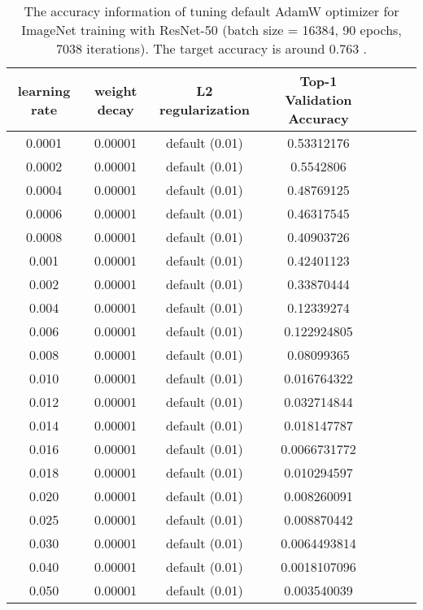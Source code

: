\documentclass{article} \usepackage{iclr2020_conference,times}
\begin{document}
\begin{table}[ht]
\renewcommand{\arraystretch}{1.3}
\caption{The accuracy information of tuning default AdamW optimizer for ImageNet training with ResNet-50 (batch size = 16384, 90 epochs, 7038 iterations). The target accuracy is around 0.763 \citep{goyal2017accurate}.}
\centering
\begin{tabular}{|c|c|c|c|c|c|c|}
\hline
learning rate & weight decay & L2 regularization & Top-1 Validation Accuracy\\
\hline
\hline
0.0001 & 0.00001 & default (0.01) & 0.53312176 \\
\hline
0.0002 & 0.00001 & default (0.01) & 0.5542806 \\
\hline
0.0004 & 0.00001 & default (0.01) & 0.48769125 \\
\hline
0.0006 & 0.00001 & default (0.01) & 0.46317545 \\
\hline
0.0008 & 0.00001 & default (0.01) & 0.40903726 \\
\hline
0.001 & 0.00001 & default (0.01) & 0.42401123 \\
\hline
0.002 & 0.00001 & default (0.01) & 0.33870444 \\
\hline
0.004 & 0.00001 & default (0.01) & 0.12339274 \\
\hline
0.006 & 0.00001 & default (0.01) & 0.122924805 \\
\hline
0.008 & 0.00001 & default (0.01) & 0.08099365 \\
\hline
0.010 & 0.00001 & default (0.01) & 0.016764322 \\
\hline
0.012 & 0.00001 & default (0.01) & 0.032714844 \\
\hline
0.014 & 0.00001 & default (0.01) & 0.018147787 \\
\hline
0.016 & 0.00001 & default (0.01) & 0.0066731772 \\
\hline
0.018 & 0.00001 & default (0.01) & 0.010294597 \\
\hline
0.020 & 0.00001 & default (0.01) & 0.008260091 \\
\hline
0.025 & 0.00001 & default (0.01) & 0.008870442 \\
\hline
0.030 & 0.00001 & default (0.01) & 0.0064493814 \\
\hline
0.040 & 0.00001 & default (0.01) & 0.0018107096 \\
\hline
0.050 & 0.00001 & default (0.01) & 0.003540039 \\
\hline
\end{tabular}
\label{table:imagenet_adamw_default_l2_1}
\end{table}
\end{document}
